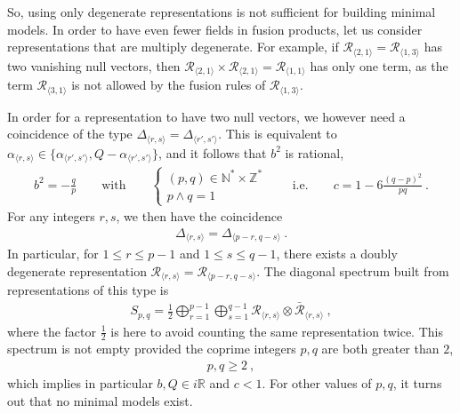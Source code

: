 \documentclass[12pt, a4paper]{article}
\theoremstyle{break}
\begin{document}
So, using only degenerate representations is not sufficient for building minimal models.
In order to have even fewer fields in fusion products, let us consider representations that are multiply degenerate. For example, if $\mathcal{R}_{\langle 2, 1\rangle} = \mathcal{R}_{\langle 1, 3\rangle}$ has two vanishing null vectors, then $\mathcal{R}_{\langle 2, 1\rangle} \times \mathcal{R}_{\langle 2, 1\rangle} = \mathcal{R}_{\langle 1,1\rangle}$ has only one term, as the term $\mathcal{R}_{\langle 3, 1\rangle}$ is not allowed by the fusion rules of $\mathcal{R}_{\langle 1, 3\rangle}$.

In order for a representation to have two null vectors, we however need a coincidence of 
the type $\Delta_{\langle r,s \rangle} = \Delta_{\langle r',s' \rangle}$. 
This is equivalent to $\alpha_{\langle r,s \rangle} \in \{ \alpha_{\langle r',s' \rangle}, Q-\alpha_{\langle r',s' \rangle}\}$, and it follows that
$b^2$ is rational,
\begin{align} 
 b^2 = - \frac{q}{p} \qquad \text{with} \qquad \left\{\begin{array}{l} (p,q)\in \mathbb{N}^*\times \mathbb{Z}^* \\ p\wedge q = 1 \end{array} \right. 
 \qquad \text{i.e.} \qquad c = 1-6\frac{(q-p)^2}{pq}\ .
 \label{eq:bcmin}
\end{align}
For any integers $r,s$, we then have the coincidence 
\begin{align}
 \Delta_{\langle r,s \rangle} = \Delta_{\langle p-r, q-s\rangle}\ .
\end{align}
In particular, for $1\leq r\leq p-1$ and $1\leq s\leq q-1$, there exists a doubly degenerate representation $\mathcal{R}_{\langle r, s\rangle} = \mathcal{R}_{\langle p-r, q-s\rangle}$. The diagonal spectrum built from representations of this type is 
\begin{align}
 S_{p, q} = \frac12 \bigoplus_{r=1}^{p-1} \bigoplus_{s=1}^{q-1} \mathcal{R}_{\langle r,s \rangle}\otimes \mathcal{\bar{R}}_{\langle r,s \rangle}\ ,
\end{align}
where the factor $\frac12$ is here to avoid counting the same representation twice. This spectrum is not empty provided the coprime integers $p,q$ are both greater than $2$,
\begin{align}
 p,q \geq 2 \ ,
 \label{eq:pqmin}
\end{align}
which implies in particular $b,Q\in i\mathbb{R}$ and $c<1$.
For other values of $p,q$, it turns out that no minimal models exist.
\end{document}
